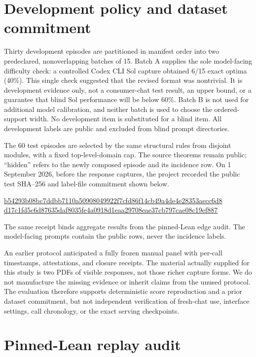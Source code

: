 

\section{Development policy and dataset commitment}

Thirty development episodes are partitioned in manifest order into two
predeclared, nonoverlapping batches of 15.  Batch A supplies the sole
model-facing difficulty check: a controlled Codex CLI Sol capture obtained 6/15
exact optima (40\%).  This single check suggested that the revised format was
nontrivial.  It is development evidence only, not a consumer-chat test result,
an upper bound, or a guarantee that blind Sol performance will be below 60\%.
Batch B is not used for additional model calibration, and neither batch is used
to choose the ordered-support width.  No development item is substituted for a
blind item.  All development labels are public and excluded from blind prompt
directories.

The 60 test episodes are selected by the same structural rules from disjoint
modules, with a fixed top-level-domain cap.  The source theorems remain public;
``hidden'' refers to the newly composed episode and its incidence row.  On 1
September 2026, before the response captures, the project recorded the public
test SHA--256 and label-file commitment shown below.
\begin{center}
\footnotesize
\url{b54293b08bc7ddbb7110a50908049922f7cfd86f14cb49a4de4e28353aecc6d8}\\[-2pt]
\url{d17c1fd5c6d87635daf8035fe4a0918d1eaa29708eae37cb797cae08c19ef887}
\end{center}
The same receipt binds aggregate results from the pinned-Lean edge audit.  The
model-facing prompts contain the public rows, never the incidence labels.

An earlier protocol anticipated a fully frozen manual panel with per-call
timestamps, attestations, and closure receipts.  The material actually supplied
for this study is two PDFs of visible responses, not those richer capture forms.
We do not manufacture the missing evidence or inherit claims from the unused
protocol.  The evaluation therefore supports deterministic score reproduction
and a prior dataset commitment, but not independent verification of fresh-chat
use, interface settings, call chronology, or the exact serving checkpoints.

\section{Pinned-Lean replay audit}

